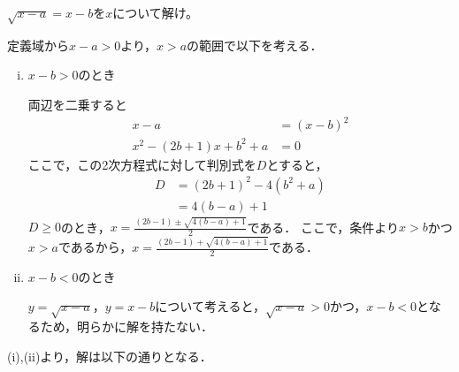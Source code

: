 \begin{problem}
$\sqrt{x-a}=x-b$を$x$について解け。
\end{problem}

定義域から$x-a>0$より，$x>a$の範囲で以下を考える．
\begin{enumerate}[(i)]
  \item $x-b>0$のとき

  両辺を二乗すると
  \begin{align*}
    x-a &= (x-b)^2 \\
    x^2 - (2b+1)x + b^2 + a &= 0
  \end{align*}
  ここで，この2次方程式に対して判別式を$D$とすると，
  \begin{align*}
    D &= (2b+1)^2 - 4(b^2+a) \\
    &= 4(b-a)+1
  \end{align*}
  $D \geq 0$のとき，$x = \frac{(2b-1)\pm\sqrt{4(b-a)+1}}{2}$である．
  ここで，条件より$x>b$かつ$x>a$であるから，$x = \frac{(2b-1) + \sqrt{4(b-a)+1}}{2}$である．

  \item $x-b<0$のとき

  $y = \sqrt{x-a}$，$y = x-b$について考えると，$\sqrt{x-a} > 0$かつ，$x-b<0$となるため，明らかに解を持たない．
\end{enumerate}

(i),(ii)より，解は以下の通りとなる．

